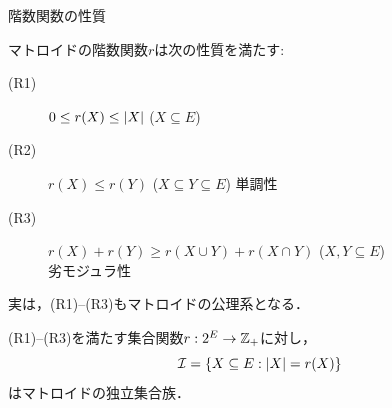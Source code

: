 \documentclass[14pt,aspectratio=169,xcolor=dvipsnames,table,onlytextwidth,dvipdfmx]{beamer}
\begin{document}
\begin{frame}{階数関数の性質}
    \begin{theorem}
        マトロイドの階数関数$r$は次の性質を満たす:
        \begin{description}
            \item[(R1)] $0 \leq r(X) \leq \lvert X\rvert$ \quad ($X \subseteq E$) 
            \item[(R2)] $r(X) \leq r(Y)$ \quad ($X \subseteq Y \subseteq E$) \hfill \alert{単調性}
            \item[(R3)] $r(X) + r(Y) \geq r(X \cup Y) + r(X \cap Y)$ \quad ($X, Y \subseteq E$) \\ \hfill\alert{劣モジュラ性}
        \end{description}
    \end{theorem}

    \vfill
    \small
    実は，(R1)--(R3)もマトロイドの公理系となる．
    \begin{theorem}
        (R1)--(R3)を満たす集合関数$r: 2^E \to \mathbb{Z}_+$に対し，
        \setlength{\abovedisplayskip}{1pt}
        \setlength{\belowdisplayskip}{1pt}
        \[
            \mathcal{I} = \{X \subseteq E: \lvert X\rvert = r(X) \} 
        \]
        はマトロイドの独立集合族．
    \end{theorem}
\end{frame}
\end{document}
